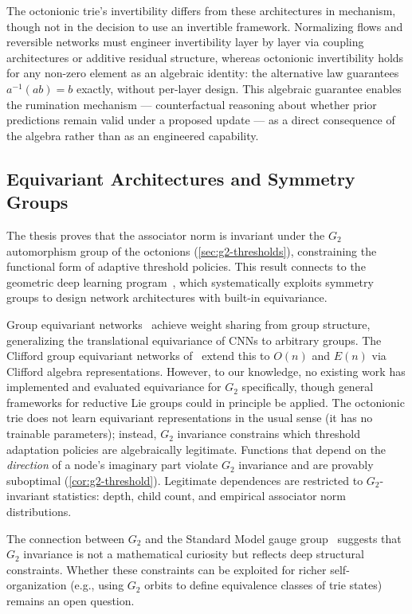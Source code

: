 \documentclass[11pt,a4paper]{article}
\theoremstyle{definition}
\theoremstyle{remark}
\begin{document}
The octonionic trie's invertibility differs from these architectures in mechanism, though not in the decision to use an invertible framework. Normalizing flows and reversible networks must engineer invertibility layer by layer via coupling architectures or additive residual structure, whereas octonionic invertibility holds for any non-zero element as an algebraic identity: the alternative law guarantees $a^{-1}(ab) = b$ exactly, without per-layer design. This algebraic guarantee enables the rumination mechanism --- counterfactual reasoning about whether prior predictions remain valid under a proposed update --- as a direct consequence of the algebra rather than as an engineered capability.

\subsection{Equivariant Architectures and Symmetry Groups}
\label{sec:equivariant}

The thesis proves that the associator norm is invariant under the $G_2$ automorphism group of the octonions (\cref{sec:g2-thresholds}), constraining the functional form of adaptive threshold policies. This result connects to the geometric deep learning program~\citep{Cohen2016,Bronstein2021}, which systematically exploits symmetry groups to design network architectures with built-in equivariance.

Group equivariant networks~\citep{Cohen2016} achieve weight sharing from group structure, generalizing the translational equivariance of CNNs to arbitrary groups. The Clifford group equivariant networks of~\citet{Ruhe2023} extend this to $O(n)$ and $E(n)$ via Clifford algebra representations. However, to our knowledge, no existing work has implemented and evaluated equivariance for $G_2$ specifically, though general frameworks for reductive Lie groups could in principle be applied. The octonionic trie does not learn equivariant representations in the usual sense (it has no trainable parameters); instead, $G_2$ invariance constrains which threshold adaptation policies are algebraically legitimate. Functions that depend on the \emph{direction} of a node's imaginary part violate $G_2$ invariance and are provably suboptimal (\cref{cor:g2-threshold}). Legitimate dependences are restricted to $G_2$-invariant statistics: depth, child count, and empirical associator norm distributions.

The connection between $G_2$ and the Standard Model gauge group~\citep{GunaydinGursey1973,Furey2016,Masi2021} suggests that $G_2$ invariance is not a mathematical curiosity but reflects deep structural constraints. Whether these constraints can be exploited for richer self-organization (e.g., using $G_2$ orbits to define equivalence classes of trie states) remains an open question.
\end{document}

